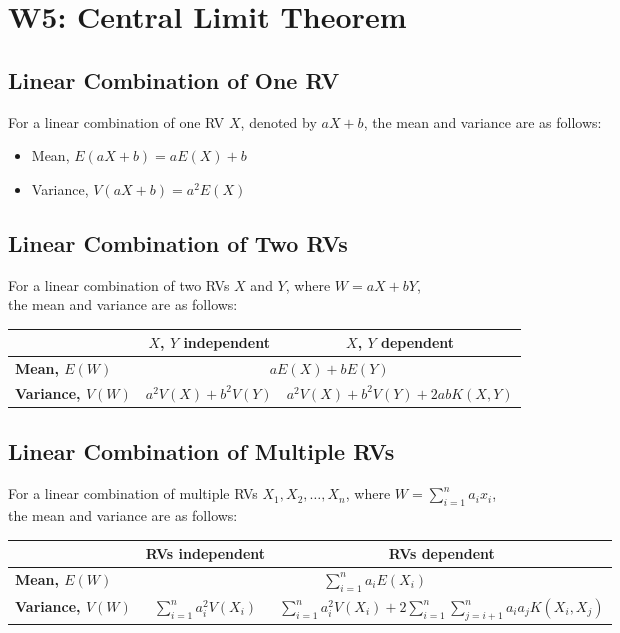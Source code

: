 \documentclass[a4paper]{article}
\begin{document}
\section{W5: Central Limit Theorem}
\subsection{Linear Combination of One RV}
For a linear combination of one RV $X$, denoted by $aX + b$, the mean and variance are as follows:
\begin{itemize}
    \item Mean, $E(aX+b) = aE(X)+b$
    \item Variance, $V(aX+b) = a^{2}E(X)$
\end{itemize}
\subsection{Linear Combination of Two RVs}
For a linear combination of two RVs $X$ and $Y$, where $W = aX + bY$,\\the mean and variance are as follows:
\begin{table}[H]
\centering
\begin{tabular}{|l|c|c|}
\hline
                          & \textbf{$X$, $Y$ independent} & \textbf{$X$, $Y$ dependent}         \\ \hline
\textbf{Mean, $E(W)$}     & \multicolumn{2}{c|}{$aE(X) + bE(Y)$}                                \\ \hline
\textbf{Variance, $V(W)$} & $a^{2}V(X) + b^{2}V(Y)$       & $a^{2}V(X) + b^{2}V(Y)+2abK(X, Y)$ \\ \hline
\end{tabular}
\end{table}
\newpage
\subsection{Linear Combination of Multiple RVs}
For a linear combination of multiple RVs $X_{1}, X_{2}, \ldots, X_{n}$, where $\displaystyle W = \sum_{i=1}^{n}a_{i}x_{i}$,\\the mean and variance are as follows:
\begin{table}[H]
\centering
{\tabulinesep=1.2mm
\begin{tabu}{|l|c|c|}
\hline
                          & \textbf{RVs independent}                        & \textbf{RVs dependent}                                                                                      \\ \hline
\textbf{Mean, $E(W)$}     &                                                                                               \\ \hline
\textbf{Variance, $V(W)$} & $\displaystyle \sum_{i=1}^{n}a_{i}^{2}V(X_{i})$ & $\displaystyle \sum_{i=1}^{n}a_{i}^{2}V(X_{i}) + 2\sum_{i=1}^{n}\sum_{j = i+1}^{n}a_{i}a_{j}K(X_{i}, X_{j})$ \\ \hline
\end{tabu}
}
\end{table}
\end{document}
